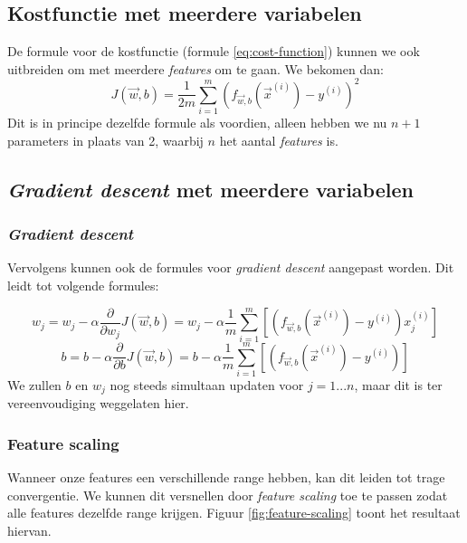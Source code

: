 \subsection{Kostfunctie met meerdere variabelen}

De formule voor de kostfunctie (formule \ref{eq:cost-function}) kunnen we ook uitbreiden om met meerdere \textit{features} om te gaan. We bekomen dan:
\begin{equation}
	J(\vec{w}, b) = \frac{1}{2m}\sum_{i=1}^{m}(f_{\vec{w},b}(\vec{x}^{(i)}) - y^{(i)})^{2}
	\label{eq:cost-function-multi}
\end{equation}
\noindent
Dit is in principe dezelfde formule als voordien, alleen hebben we nu $n+1$ parameters in plaats van 2, waarbij $n$ het aantal \textit{features} is.

\subsection{\textit{Gradient descent} met meerdere variabelen}

\subsubsection{\textit{Gradient descent}}

Vervolgens kunnen ook de formules voor \textit{gradient descent} aangepast worden. Dit leidt tot volgende formules:

\begin{equation}
	w_{j} = w_{j} - \alpha \frac{\partial}{\partial w_{j}} J(\vec{w}, b) = w_{j} - \alpha \frac{1}{m}\sum_{i=1}^{m}[(f_{\vec{w},b}(\vec{x}^{(i)}) - y^{(i)})x^{(i)}_{j}]
	\label{eq:gradient-descent-lin-reg-multi-w}
\end{equation}
\begin{equation}
	b = b - \alpha \frac{\partial}{\partial b} J(\vec{w}, b) = b - \alpha \frac{1}{m}\sum_{i=1}^{m}[(f_{\vec{w},b}(\vec{x}^{(i)}) - y^{(i)})]
	\label{eq:gradient-descent-lin-reg-multi-b}
\end{equation}
\noindent
We zullen $b$ en $w_{j}$ nog steeds simultaan updaten voor $j = 1...n$, maar dit is ter vereenvoudiging weggelaten hier.

\subsubsection{Feature scaling}

Wanneer onze features een verschillende range hebben, kan dit leiden tot trage convergentie. We kunnen dit versnellen door \textit{feature scaling} toe te passen zodat alle features dezelfde range krijgen. Figuur \ref{fig:feature-scaling} toont het resultaat hiervan.

